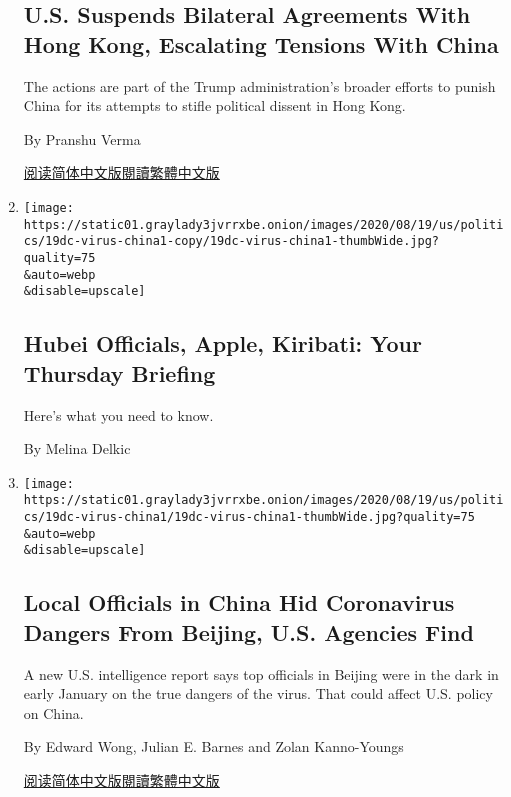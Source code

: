 \begin{enumerate}
{  \subsection{U.S. Suspends Bilateral Agreements With Hong Kong,
  Escalating Tensions With
  China}\label{us-suspends-bilateral-agreements-with-hong-kong-escalating-tensions-with-china}}

  The actions are part of the Trump administration's broader efforts to
  punish China for its attempts to stifle political dissent in Hong
  Kong.

  By Pranshu Verma

  \href{https://cn.nytimes3xbfgragh.onion/usa/20200820/trump-china-hong-kong/}{阅读简体中文版}\href{https://cn.nytimes3xbfgragh.onion/usa/20200820/trump-china-hong-kong/zh-hant/}{閱讀繁體中文版}
\item
  \href{/2020/08/19/briefing/hubei-officials-australian-vaccine-apple.html}{}

  \texttt{[image: https://static01.graylady3jvrrxbe.onion/images/2020/08/19/us/politics/19dc-virus-china1-copy/19dc-virus-china1-thumbWide.jpg?quality=75\\\&auto=webp\\\&disable=upscale]}

  \hypertarget{hubei-officials-apple-kiribati-your-thursday-briefing}{%
  \subsection{Hubei Officials, Apple, Kiribati: Your Thursday
  Briefing}\label{hubei-officials-apple-kiribati-your-thursday-briefing}}

  Here's what you need to know.

  By Melina Delkic
\item
  \href{/2020/08/19/world/asia/china-coronavirus-beijing-trump.html}{}

  \texttt{[image: https://static01.graylady3jvrrxbe.onion/images/2020/08/19/us/politics/19dc-virus-china1/19dc-virus-china1-thumbWide.jpg?quality=75\\\&auto=webp\\\&disable=upscale]}

  \hypertarget{local-officials-in-china-hid-coronavirus-dangers-from-beijing-us-agencies-find}{%
  \subsection{Local Officials in China Hid Coronavirus Dangers From
  Beijing, U.S. Agencies
  Find}\label{local-officials-in-china-hid-coronavirus-dangers-from-beijing-us-agencies-find}}

  A new U.S. intelligence report says top officials in Beijing were in
  the dark in early January on the true dangers of the virus. That could
  affect U.S. policy on China.

  By Edward Wong, Julian E. Barnes and Zolan Kanno-Youngs

  \href{https://cn.nytimes3xbfgragh.onion/asia-pacific/20200820/china-coronavirus-beijing-trump/}{阅读简体中文版}\href{https://cn.nytimes3xbfgragh.onion/asia-pacific/20200820/china-coronavirus-beijing-trump/zh-hant/}{閱讀繁體中文版}
\end{enumerate}

